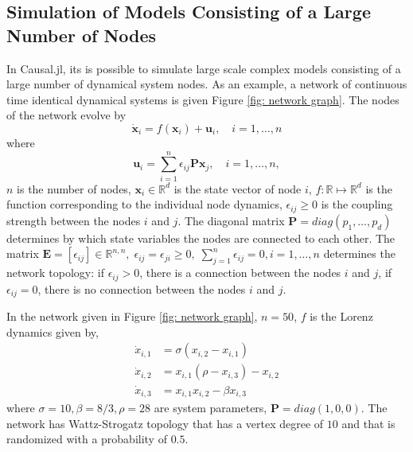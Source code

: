 \documentclass{juliacon}
\begin{document}
\subsection{Simulation of Models Consisting of a Large Number of Nodes}
In Causal.jl, its is possible to simulate large scale complex models consisting of a large number of dynamical system nodes. As an example, a network of continuous time identical dynamical systems is given Figure \ref{fig: network graph}. The nodes of the network evolve by 
\begin{equation}
    \dot{\bm{x}}_i = f(\bm{x}_i) + \bm{u}_i, \quad i = 1, \ldots, n
    \label{eq: network equation}
\end{equation}
where 
\begin{equation}
    \bm{u}_i = \sum_{i = 1}^n \epsilon_{ij} \bm{P} \bm{x}_j, \quad i = 1, \ldots, n,
    \label{eq: network node inputs}
\end{equation}
$n$ is the number of nodes, $\bm{x}_i \in \mathbb{R}^d$ is the state vector of node $i$, $f: \mathbb{R} \mapsto \mathbb{R}^d$ is the function corresponding to the individual node dynamics, $\epsilon_{ij} \geq 0 $ is the coupling strength between the nodes $i$ and $j$. The diagonal matrix $\bm{P} = diag(p_1, \ldots, p_d)$ determines by which state variables the nodes are connected to each other. The matrix $\bm{E} = [\epsilon_{ij}] \in \mathbb{R}^{n, n}, \; \epsilon_{ij} = \epsilon_{ji} \geq 0, \; \sum_{j = 1}^n \epsilon_{ij} = 0, i = 1, \ldots, n$ determines the network topology: if $\epsilon_{ij} > 0$, there is a connection between the nodes $i$ and $j$, if $\epsilon_{ij} = 0$, there is no connection between the nodes $i$ and $j$.

In the network given in Figure \ref{fig: network graph}, $n=50$,  $f$ is the Lorenz dynamics given by,
\begin{equation}
    \begin{split}
        \dot{x}_{i,1} &= \sigma (x_{i, 2} - x_{i, 1}) \\
        \dot{x}_{i,2} &= x_{i, 1} (\rho -  x_{i, 3}) - x_{i, 2} \\
        \dot{x}_{i,3} &= x_{i, 1} x_{i, 2} - \beta x_{i, 3}
    \end{split}
\end{equation}
where $\sigma=10, \beta=8/3, \rho=28$ are system parameters, $\bm{P} = diag(1, 0, 0)$. The network has Wattz-Strogatz topology that has a vertex degree of $10$ and that is randomized with a probability of $0.5$\cite{watts1998collective}.
\end{document}
